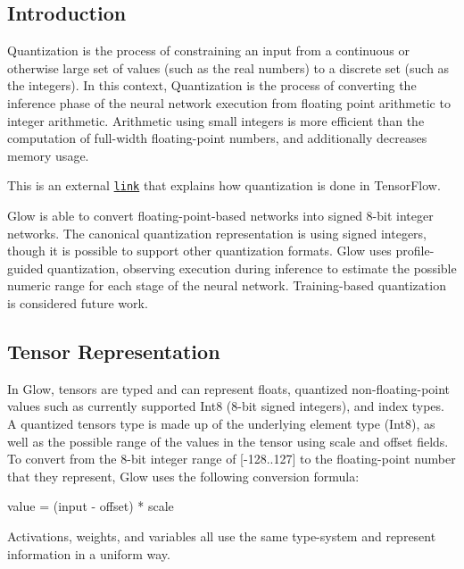 \subsection*{Introduction}

Quantization is the process of constraining an input from a continuous or otherwise large set of values (such as the real numbers) to a discrete set (such as the integers). In this context, Quantization is the process of converting the inference phase of the neural network execution from floating point arithmetic to integer arithmetic. Arithmetic using small integers is more efficient than the computation of full-\/width floating-\/point numbers, and additionally decreases memory usage.

This is an external \href{https://www.tensorflow.org/performance/quantization}{\tt link} that explains how quantization is done in Tensor\+Flow.

Glow is able to convert floating-\/point-\/based networks into signed 8-\/bit integer networks. The canonical quantization representation is using signed integers, though it is possible to support other quantization formats. Glow uses profile-\/guided quantization, observing execution during inference to estimate the possible numeric range for each stage of the neural network. Training-\/based quantization is considered future work.

\subsection*{Tensor Representation}

In Glow, tensors are typed and can represent floats, quantized non-\/floating-\/point values such as currently supported Int8 (8-\/bit signed integers), and index types. A quantized tensor\textquotesingle{}s type is made up of the underlying element type (Int8), as well as the possible range of the values in the tensor using \textquotesingle{}scale\textquotesingle{} and \textquotesingle{}offset\textquotesingle{} fields. To convert from the 8-\/bit integer range of \mbox{[}-\/128..127\mbox{]} to the floating-\/point number that they represent, Glow uses the following conversion formula\+:


\begin{DoxyCode}
value = (input - offset) * scale
\end{DoxyCode}


Activations, weights, and variables all use the same type-\/system and represent information in a uniform way.

